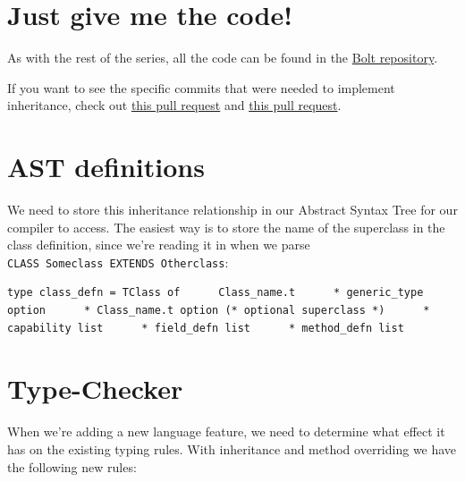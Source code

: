 \hypertarget{just-give-me-the-code}{%
\section{\texorpdfstring{\protect\hyperlink{just-give-me-the-code}{}Just
give me the
code!}{Just give me the code!}}\label{just-give-me-the-code}}

As with the rest of the series, all the code can be found in the
\href{https://github.com/mukul-rathi/bolt}{Bolt repository}.

If you want to see the specific commits that were needed to implement
inheritance, check out
\href{https://github.com/mukul-rathi/bolt/pull/133}{this pull request}
and \href{https://github.com/mukul-rathi/bolt/pull/136}{this pull
request}.

\hypertarget{ast-definitions}{%
\section{\texorpdfstring{\protect\hyperlink{ast-definitions}{}AST
definitions}{AST definitions}}\label{ast-definitions}}

We need to store this inheritance relationship in our Abstract Syntax
Tree for our compiler to access. The easiest way is to store the name of
the superclass in the class definition, since we're reading it in when
we parse \texttt{CLASS\ Someclass\ EXTENDS\ Otherclass}:

%

\begin{lstlisting}[language=caml,caption={parsed\_ast.mli}]
type class_defn = TClass of      Class_name.t      * generic_type option      * Class_name.t option (* optional superclass *)      * capability list      * field_defn list      * method_defn list
\end{lstlisting}

\hypertarget{type-checker}{%
\section{\texorpdfstring{\protect\hyperlink{type-checker}{}Type-Checker}{Type-Checker}}\label{type-checker}}

When we're adding a new language feature, we need to determine what
effect it has on the existing typing rules. With inheritance and method
overriding we have the following new rules:

